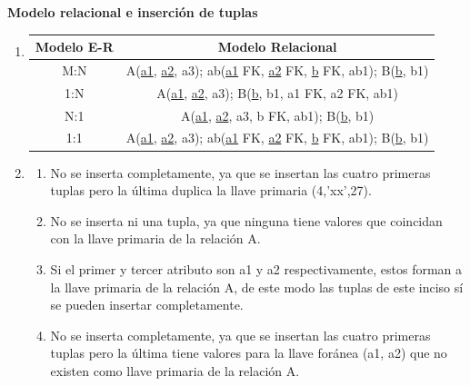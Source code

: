 \documentclass{exam}
\begin{document}
\begin{questions}
	\newpage
	\question \textbf{Modelo relacional e inserción de tuplas}
	\begin{enumerate}[label=\alph*.]
		\item 
		
	\begin{tabular}{| c | c |}
		\hline
	    Modelo E-R & Modelo Relacional  \\ \hline
        M:N & A(\underline{a1}, \underline{a2}, a3); 
ab(\underline{a1} FK, \underline{a2} FK, \underline{b} FK, ab1); 
B(\underline{b}, b1) \\ \hline
        1:N & A(\underline{a1}, \underline{a2}, a3); 
B(\underline{b}, b1, a1 FK, a2 FK, ab1) \\ \hline
        N:1 & A(\underline{a1}, \underline{a2}, a3, b FK, ab1); 
B(\underline{b}, b1) \\ \hline
        1:1 & A(\underline{a1}, \underline{a2}, a3); 
ab(\underline{a1} FK, \underline{a2} FK, \underline{b} FK, ab1); 
B(\underline{b}, b1) \\ \hline
    \end{tabular} 
	
		\item 
		\begin{enumerate}[label=(\roman*)]
			\item No se inserta completamente, ya que se insertan las cuatro primeras tuplas pero la última duplica la llave primaria (4,'xx',27).
			\item No se inserta ni una tupla, ya que ninguna tiene valores que coincidan con la llave primaria de la relación A.
			\item Si el primer y tercer atributo son a1 y a2 respectivamente, estos forman a la llave primaria de la relación A, de este modo las tuplas de este inciso
sí se pueden insertar completamente.
			\item No se inserta completamente, ya que se insertan las cuatro primeras tuplas pero la última tiene valores para la llave foránea (a1, a2)
que no existen como llave primaria de la relación A.
		\end{enumerate}
		

\end{enumerate}
\end{questions}
\end{document}
